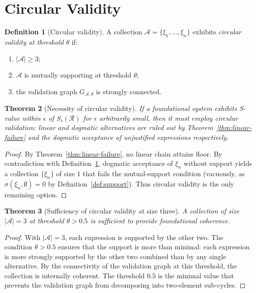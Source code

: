 \documentclass[twocolumn,11pt,a4paper]{article}
\theoremstyle{thmstyle}
\newtheorem{theorem}{Theorem}[section]
\theoremstyle{thmstyle}
\theoremstyle{definition}
\newtheorem{definition}[theorem]{Definition}
\theoremstyle{remark}
\newcommand{\Ax}{\mathcal{A}}
\newcommand{\receiver}{\mathcal{R}}
\newcommand{\Sfloor}{S_{\flat}}
\begin{document}
\section{Circular Validity}
\label{sec:circular-validity}

\begin{definition}[Circular validity]\label{def:circular-validity}
A collection $\Ax = \{\xi_{1}, \ldots, \xi_{n}\}$
exhibits \emph{circular validity at threshold
$\theta$} if:
\begin{enumerate}[nosep,label=(\roman*)]
\item $|\Ax| \geq 3$;
\item $\Ax$ is mutually supporting at threshold
      $\theta$;
\item the validation graph $G_{\Ax, \theta}$ is
      strongly connected.
\end{enumerate}
\end{definition}

\begin{theorem}[Necessity of circular validity]
\label{thm:nec-circular}
If a foundational system exhibits S-value within
$\epsilon$ of $\Sfloor(\receiver)$ for $\epsilon$
arbitrarily small, then it must employ circular
validation: linear and dogmatic alternatives are
ruled out by Theorem~\ref{thm:linear-failure} and
the dogmatic acceptance of unjustified expressions
respectively.
\end{theorem}

\begin{proof}
By Theorem~\ref{thm:linear-failure}, no linear chain
attains floor.  By contradiction with
Definition~\ref{def:circular-validity}, dogmatic
acceptance of $\xi_{n}$ without support yields a
collection $\{\xi_{n}\}$ of size $1$ that fails the
mutual-support condition (vacuously, as
$\sigma(\xi_{n}, \emptyset) = 0$ by
Definition~\ref{def:support}).  Thus circular
validity is the only remaining option.
\end{proof}

\begin{theorem}[Sufficiency of circular validity at
size three]\label{thm:suff-circular-three}
A collection of size $|\Ax| = 3$ at threshold
$\theta > 0.5$ is sufficient to provide
foundational coherence.
\end{theorem}

\begin{proof}
With $|\Ax| = 3$, each expression is supported by
the other two.  The condition $\theta > 0.5$ ensures
that the support is more than minimal: each
expression is more strongly supported by the other
two combined than by any single alternative.  By
the connectivity of the validation graph at this
threshold, the collection is internally coherent.
The threshold $0.5$ is the minimal value that
prevents the validation graph from decomposing into
two-element sub-cycles.
\end{proof}
\end{document}
